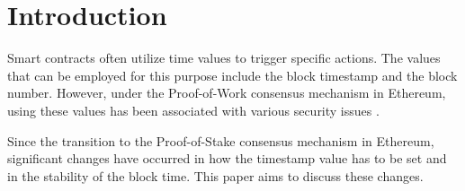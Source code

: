 \section{Introduction}

Smart contracts often utilize time values to trigger specific actions. The
values that can be employed for this purpose include the block timestamp and
the block number. However, under the Proof-of-Work consensus mechanism in
Ethereum, using these values has been associated with various security issues
\cite{swc116} \cite{Conkas2021} \cite{DASP2018} \cite{Osiris2018}
\cite{Oyente2016}.

Since the transition to the Proof-of-Stake consensus mechanism in
Ethereum, significant changes have occurred in how the timestamp value has to
be set and in the stability of the block time. This paper aims to discuss these
changes.

